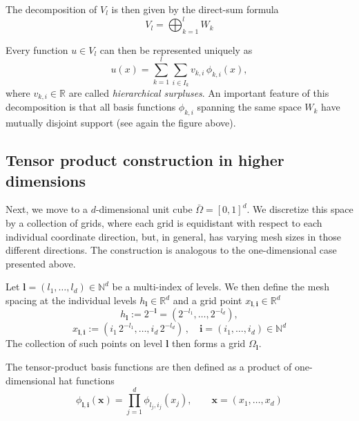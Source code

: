 \begin{center}
\end{center}
\vspace{1em}


The decomposition of $V_l$ is then given by the direct-sum formula
$$
V_l = \bigoplus_{k=1}^l W_k
$$


Every function $u\in V_l$ can then be represented uniquely as
$$
u(x)=\sum_{k=1}^l \sum_{i\in I_k} v_{k,i}\,\phi_{k,i}(x),
$$
where $v_{k,i}\in \mathbb R$ are called \textit{hierarchical surpluses}.
An important feature of this decomposition is that all basis functions $\phi_{k,i}$
spanning the same space $W_k$ have mutually disjoint support (see again the figure above).


\subsection{Tensor product construction in higher dimensions}


Next, we move to a $d$-dimensional unit cube $\bar{\Omega}=\left[0,1\right]^d$.
We discretize this space by a collection of grids, where
each grid is equidistant with respect to each individual coordinate direction,
but, in general, has varying mesh sizes in those different directions. 
The construction is analogous to the one-dimensional case presented above.

Let $\mathbf{l}=(l_1,\dots,l_d)\in\mathbb{N}^d$ be a multi-index of levels.
We then define the mesh spacing at the individual levels $h_\mathbf{l}\in\mathbb{R}^d$
and a grid point $x_{\mathbf{l},\mathbf{i}}\in\mathbb{R}^d$
$$
h_\mathbf{l} :=  2^{-\mathbf{l}} = (2^{-l_1},\dots,2^{-l_d}),
$$
$$
x_{\mathbf{l},\mathbf{i}}
:= (i_1\,2^{-l_1},\dots,i_d\,2^{-l_d})\,,\quad
\mathbf{i}=(i_1,\dots,i_d)\in\mathbb{N}^d
$$
The collection of such points on level $\mathbf l$ then forms a grid $\Omega_\mathbf{l}$.

The tensor-product basis functions are then defined as a product of one-dimensional hat functions
$$
\phi_{\mathbf{l},\mathbf{i}}(\mathbf{x})
=
\prod_{j=1}^d \phi_{l_j,i_j}(x_j),
\qquad \mathbf{x}=(x_1,\dots,x_d)
$$

